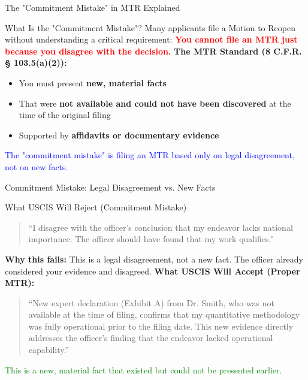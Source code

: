 \documentclass[11pt]{beamer}
\begin{document}
	\begin{frame}{The "Commitment Mistake" in MTR Explained}
		\scriptsize
		\begin{block}{What Is the "Commitment Mistake"?}
			Many applicants file a Motion to Reopen without understanding a critical requirement:
			\vspace{0.2cm}
			\textcolor{red}{\textbf{You cannot file an MTR just because you disagree with the decision.}}
			\vspace{0.2cm}
			\textbf{The MTR Standard (8 C.F.R. § 103.5(a)(2)):}
			\begin{itemize}
				\item You must present \textbf{new, material facts}
				\item That were \textbf{not available and could not have been discovered} at the time of the original filing
				\item Supported by \textbf{affidavits or documentary evidence}
			\end{itemize}
			\textcolor{blue}{The "commitment mistake" is filing an MTR based only on legal disagreement, not on new facts.}
		\end{block}
	\end{frame}
	
	\begin{frame}{Commitment Mistake: Legal Disagreement vs. New Facts}
		\scriptsize
		\begin{block}{What USCIS Will Reject (Commitment Mistake)}
			\begin{quote}
				``I disagree with the officer's conclusion that my endeavor lacks national importance. The officer should have found that my work qualifies.''
			\end{quote}
			\textbf{Why this fails:} This is a legal disagreement, not a new fact. The officer already considered your evidence and disagreed.
			\vspace{0.3cm}
			\textbf{What USCIS Will Accept (Proper MTR):}
			\begin{quote}
				``New expert declaration (Exhibit A) from Dr. Smith, who was not available at the time of filing, confirms that my quantitative methodology was fully operational prior to the filing date. This new evidence directly addresses the officer's finding that the endeavor lacked operational capability.''
			\end{quote}
			\textcolor{green}{This is a new, material fact that existed but could not be presented earlier.}
		\end{block}
	\end{frame}
	
\end{document}
